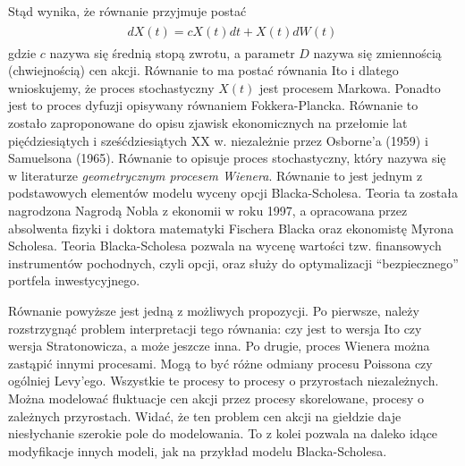 \documentclass[a4paper,12pt,polish]{sphinxmanual}
\begin{document}
Stąd wynika, że równanie przyjmuje postać
\label{ch3/chIII033:equation-eqn11}\begin{gather}
\begin{split}dX(t) = c X(t) dt + X(t) d W(t)\,\end{split}\label{ch3/chIII033-eqn11}
\end{gather}
gdzie $c$ nazywa się średnią stopą zwrotu, a parametr $D$ nazywa się zmiennością (chwiejnością) cen akcji. Równanie to ma postać równania Ito i dlatego wnioskujemy, że proces stochastyczny $X(t)$ jest procesem Markowa. Ponadto jest to proces dyfuzji opisywany równaniem Fokkera-Plancka. Równanie to zostało zaproponowane do opisu zjawisk ekonomicznych na przełomie lat pięćdziesiątych i sześćdziesiątych XX w. niezależnie przez Osborne’a (1959) i Samuelsona (1965). Równanie to opisuje proces stochastyczny, który nazywa się w literaturze \emph{geometrycznym procesem Wienera}. Równanie to jest jednym z podstawowych elementów modelu wyceny opcji Blacka-Scholesa. Teoria ta została nagrodzona Nagrodą Nobla z ekonomii w roku 1997, a opracowana przez absolwenta fizyki i doktora matematyki Fischera Blacka oraz ekonomistę Myrona Scholesa. Teoria Blacka-Scholesa pozwala na wycenę wartości tzw. finansowych instrumentów pochodnych, czyli opcji, oraz służy do optymalizacji ``bezpiecznego'' portfela inwestycyjnego.

Równanie powyższe jest jedną z możliwych propozycji. Po pierwsze, należy rozstrzygnąć problem interpretacji tego równania: czy jest to wersja Ito czy wersja Stratonowicza, a może jeszcze inna. Po drugie, proces Wienera można zastąpić innymi procesami. Mogą to być różne odmiany procesu Poissona czy ogólniej Levy'ego. Wszystkie te procesy to procesy o przyrostach niezależnych. Można modelować fluktuacje cen akcji przez procesy skorelowane, procesy o zależnych przyrostach. Widać, że ten problem cen akcji na giełdzie daje niesłychanie szerokie pole do modelowania. To z kolei pozwala na daleko idące modyfikacje innych modeli, jak na przykład modelu Blacka-Scholesa.
\end{document}

